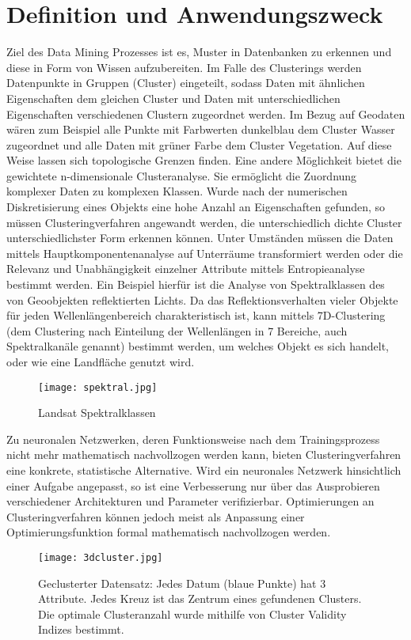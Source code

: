 \documentclass[11pt,ceqn]{book}
\begin{document}
\section{Definition und Anwendungszweck}
Ziel des Data Mining Prozesses ist es, Muster in Datenbanken zu erkennen und diese in Form von Wissen aufzubereiten. Im Falle des Clusterings werden Datenpunkte in Gruppen (Cluster) eingeteilt, sodass Daten mit ähnlichen Eigenschaften dem gleichen Cluster und Daten mit unterschiedlichen Eigenschaften verschiedenen Clustern zugeordnet werden. Im Bezug auf Geodaten wären zum Beispiel alle Punkte mit Farbwerten dunkelblau dem Cluster Wasser zugeordnet und alle Daten mit grüner Farbe dem Cluster Vegetation. Auf diese Weise lassen sich topologische Grenzen finden. Eine andere Möglichkeit bietet die gewichtete n-dimensionale Clusteranalyse. Sie ermöglicht die Zuordnung komplexer Daten zu komplexen Klassen. Wurde nach der numerischen Diskretisierung eines Objekts eine hohe Anzahl an Eigenschaften gefunden, so müssen Clusteringverfahren angewandt werden, die unterschiedlich dichte Cluster unterschiedlichster Form erkennen können. Unter Umständen müssen die Daten mittels Hauptkomponentenanalyse auf Unterräume transformiert werden oder die Relevanz und Unabhängigkeit einzelner Attribute mittels Entropieanalyse bestimmt werden. Ein Beispiel hierfür ist die Analyse von Spektralklassen des von Geoobjekten reflektierten Lichts. Da das Reflektionsverhalten vieler Objekte für jeden Wellenlängenbereich charakteristisch ist, kann mittels 7D-Clustering (dem Clustering nach Einteilung der Wellenlängen in 7 Bereiche, auch Spektralkanäle genannt) bestimmt werden, um welches Objekt es sich handelt, oder wie eine Landfläche genutzt wird. \newpage
\begin{figure}[H]
\centering
\texttt{[image: spektral.jpg]}
\caption{Landsat Spektralklassen \protect\footnotemark}
\end{figure}
Zu neuronalen Netzwerken, deren Funktionsweise nach dem Trainingsprozess nicht mehr mathematisch nachvollzogen werden kann, bieten Clusteringverfahren eine konkrete, statistische Alternative. Wird ein neuronales Netzwerk hinsichtlich einer Aufgabe angepasst, so ist eine Verbesserung nur über das Ausprobieren verschiedener Architekturen und Parameter verifizierbar. Optimierungen an Clusteringverfahren können jedoch meist als Anpassung einer Optimierungsfunktion formal mathematisch nachvollzogen werden.

\begin{figure}[H]
\centering
\texttt{[image: 3dcluster.jpg]}
\caption{Geclusterter Datensatz: Jedes Datum (blaue Punkte) hat 3 Attribute. Jedes Kreuz ist das Zentrum eines gefundenen Clusters. Die optimale Clusteranzahl wurde mithilfe von Cluster Validity Indizes bestimmt.}\label{cluster}
\end{figure}
\end{document}
